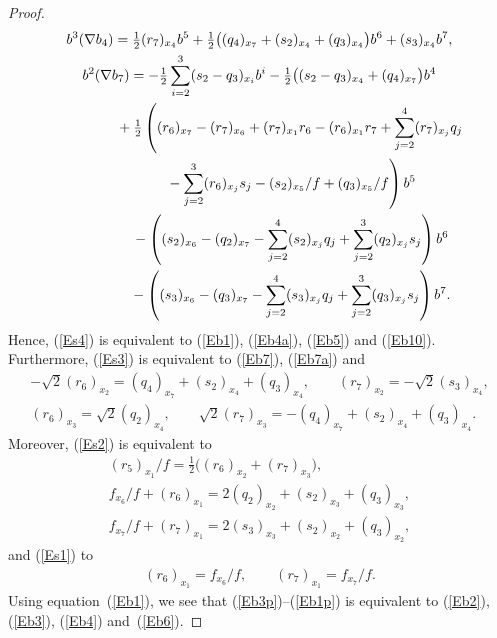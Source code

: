 \documentclass[pdftex]{sigma}
\numberwithin{equation}{section}
\begin{document}
\begin{proof}
\begin{gather*}
b^3(\nabla b_4) = \tfrac12 (r_7)_{x_4} b^5+\tfrac12\big((q_4)_{x_7}+(s_2)_{x_4}+(q_3)_{x_4}\big) b^6+(s_3)_{x_4} b^7 , \label{En7}\\
b^2(\nabla b_7) = -\tfrac12 \sum_{i=2}^3(s_2-q_3)_{x_i} b^i -\tfrac12 \big((s_2-q_3)_{x_4}+(q_4)_{x_7}\big) b^4 \nonumber \\
\hphantom{b^2(\nabla b_7) =}{} +\tfrac12 \left( (r_6)_{x_7}-(r_7)_{x_6} +(r_7)_{x_1}r_6-(r_6)_{x_1}r_7+\sum_{j=2}^4 (r_7)_{x_j}q_j \right. \nonumber\\
 \left. \hphantom{b^2(\nabla b_7) =}{} -\sum_{j=2}^3 (r_6)_{x_j}s_j -(s_2)_{x_5}/f+(q_3)_{x_5}/f\right) b^5 \label{En8} \\
\hphantom{b^2(\nabla b_7) =}{} -\left((s_2)_{x_6}-(q_2)_{x_7}-\sum_{j=2}^4(s_2)_{x_j}q_j+\sum_{j=2}^3(q_2)_{x_j}s_j\right) b^6 \nonumber\\
\hphantom{b^2(\nabla b_7) =}{} -\left( (s_3)_{x_6}-(q_3)_{x_7}-\sum_{j=2}^4(s_3)_{x_j}q_j+\sum_{j=2}^3(q_3)_{x_j}s_j \right) b^7 .\nonumber
\end{gather*}
Hence, (\ref{Es4}) is equivalent to (\ref{Eb1}), (\ref{Eb4a}), (\ref{Eb5}) and (\ref{Eb10}). Furthermore, (\ref{Es3}) is equivalent to (\ref{Eb7}), (\ref{Eb7a}) and
\begin{gather}
 -\sqrt{2} (r_6)_{x_2}= (q_4)_{x_7}+(s_2)_{x_4}+(q_3)_{x_4},\qquad (r_7)_{x_2}=-\sqrt{2} (s_3)_{x_4},\label{Eb3p}\\
 (r_6)_{x_3}=\sqrt{2} (q_2)_{x_4},\qquad \sqrt{2}(r_7)_{x_3}= -(q_4)_{x_7}+(s_2)_{x_4}+(q_3)_{x_4}.\label{Eb4p}
\end{gather}
Moreover, (\ref{Es2}) is equivalent to
\begin{gather}
(r_5)_{x_1}/f = \tfrac12 \big( (r_6)_{x_2}+(r_7)_{x_3}\big),\label{Ebeg}\\
f_{x_6}/f+(r_6)_{x_1}=2(q_2)_{x_2}+(s_2)_{x_3}+(q_3)_{x_3},\\
f_{x_7}/f+(r_7)_{x_1}=2(s_3)_{x_3}+(s_2)_{x_2}+(q_3)_{x_2},\label{Eend}
\end{gather}
and (\ref{Es1}) to
\begin{gather}\label{Eb1p}
(r_6)_{x_1}=f_{x_6}/f, \qquad (r_7)_{x_1}=f_{x_7}/f.
\end{gather}
Using equation~(\ref{Eb1}), we see that (\ref{Eb3p})--(\ref{Eb1p}) is equivalent to (\ref{Eb2}), (\ref{Eb3}), (\ref{Eb4}) \linebreak and~(\ref{Eb6}).
 \end{proof}
\end{document}
